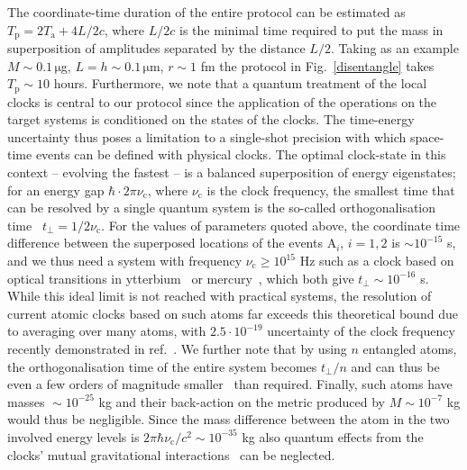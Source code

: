 \documentclass[a4paper,11pt]{article}
\begin{document}
The coordinate-time duration of the entire protocol can be estimated as $T_\mathrm{p}=2T_\mathrm{a}+4L/2c$, where $L/2c$ is the minimal time required to put the mass in superposition of amplitudes separated by the distance $L/2$.  Taking as an example
$M\sim0.1\, \mathrm\mu$g, $L=h\sim0.1\,\mathrm \mu$m, $r\sim1$ fm the protocol in  Fig.~\ref{disentangle} takes $T_\mathrm{p}\sim10$ hours. 
Furthermore, we note that a quantum treatment of the local clocks is central to our protocol since the application of the operations on the target systems is conditioned on the states of the clocks. The time-energy uncertainty \cite{fleming, mandelstam} thus poses a limitation to a single-shot precision with which space-time events can be defined with physical clocks. The optimal clock-state in this context -- evolving the fastest --  is a balanced superposition of energy eigenstates; for an energy gap $\hbar\cdot2\pi\nu_\mathrm{c}$, where $\nu_\mathrm{c}$ is the clock frequency, the smallest time that can be resolved by a single quantum system is the so-called orthogonalisation time~\cite{margolus, kosinski, zielinski} $t_{\perp}=1/2\nu_\mathrm{c}$. For the values of parameters quoted above, the coordinate time difference between the superposed locations of the events $\mathrm A_i$, $i=1,2$ is $\sim10^{-15}$ s, and we thus need a system with frequency $\nu_\mathrm{c}\geq10^{15}$ Hz such as a clock based on optical transitions in ytterbium~\cite{Pizzocaro_2017} or mercury~\cite{Hoyt:PRLabsolute}, which both  give $t_\perp\sim 10^{-16}$ s. While this ideal limit is not reached with practical systems, the resolution of current atomic clocks based on such atoms far exceeds this theoretical bound due to averaging over many atoms, with $2.5\cdot10^{-19}$ uncertainty of the clock frequency recently demonstrated in ref.~\cite{PhysRevLett.120.103201}. We further note that by using $n$ entangled atoms, the orthogonalisation time of the entire system becomes $t_\perp/n$ and can thus be even a few orders of magnitude smaller~\cite{PhysRevLett.117.060506} than required.  Finally,  such atoms have masses $\!\sim\!10^{-25}$ kg and their back-action on the metric produced by $M\!\sim\!10^{-7}$ kg  would thus be negligible. Since the mass difference between the atom in the two involved energy levels is $2\pi\hbar\nu_\mathrm{c}/c^2\sim10^{-35}$ kg also  quantum effects from the clocks' mutual gravitational interactions~\cite{Castro:2017EntangledClocks} can  be neglected.
\end{document}
